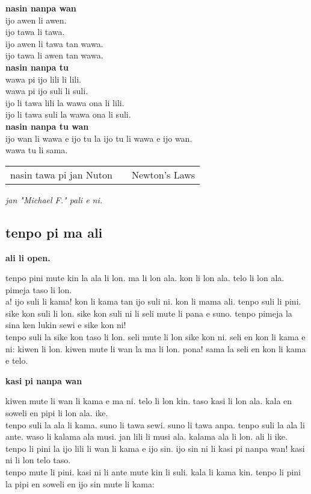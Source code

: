 \textbf{nasin nanpa wan}    \\
ijo awen li awen.    \\
ijo tawa li tawa.    \\
ijo awen li tawa tan wawa.    \\
ijo tawa li awen tan wawa.   \\
\textbf{nasin nanpa tu}    \\
wawa pi ijo lili li lili.    \\
wawa pi ijo suli li suli.    \\
ijo li tawa lili la wawa ona li lili.    \\
ijo li tawa suli la wawa ona li suli.       \\
\textbf{nasin nanpa tu wan}    \\
ijo wan li wawa e ijo tu la ijo tu li wawa e ijo wan.    \\
wawa tu li sama.

\begin{supertabular}{p{5,5cm}|ll}
nasin tawa pi jan Nuton && Newton's Laws \\
\end{supertabular}

\textit{jan "Michael F."   pali e ni. \cite{www:failbluedot:01}}
%
\subsection{tenpo pi ma ali}

\textbf{ali li open.} 

tenpo pini mute kin la ala li lon. ma li lon ala. kon li lon ala. telo li lon ala. pimeja taso li lon. \\
a! ijo suli li kama! kon li kama tan ijo suli ni. kon li mama ali. tenpo suli li pini. sike kon suli li lon. sike kon suli ni li seli mute li pana e suno. tenpo pimeja la sina ken lukin sewi e sike kon ni!  \\
tenpo suli la sike kon taso li lon. seli mute li lon sike kon ni. seli en kon li kama e ni: kiwen li lon. kiwen mute li wan la ma li lon. pona! sama la seli en kon li kama e telo.

\textbf{kasi pi nanpa wan} 

kiwen mute li wan li kama e ma ni. telo li lon kin. taso kasi li lon ala. kala en soweli en pipi li lon ala. ike.  \\
tenpo suli la ala li kama. suno li tawa sewi. suno li tawa anpa. tenpo suli la ala li ante. waso li kalama ala musi. jan lili li musi ala. kalama ala li lon. ali li ike. tenpo li pini la ijo lili li wan li kama e ijo sin. ijo sin ni li kasi pi nanpa wan! kasi ni li lon telo taso.   \\
tenpo mute li pini. kasi ni li ante mute kin li suli. kala li kama kin. tenpo li pini la pipi en soweli en ijo sin mute li kama:

